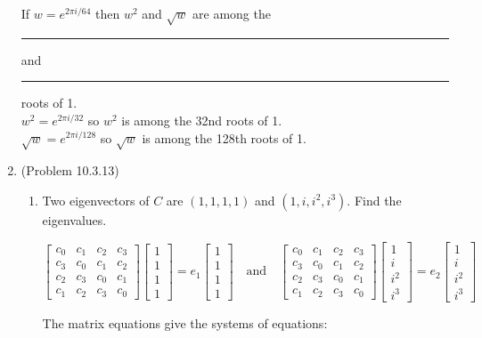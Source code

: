 \documentclass[a4paper]{article}
\begin{document}
\begin{enumerate}
If $w = e^{2\pi i / 64}$ then $w^2$ and $\sqrt{w}$ are among the \rule{1cm}{0.15mm} and \rule{1cm}{0.15mm} roots of 1. \\

$w^2 = e^{2\pi i / 32}$ so $w^2$ is among the 32nd roots of 1. \\
$\sqrt{w} = e^{2\pi i / 128}$ so $\sqrt{w}$ is among the 128th roots of 1. 

\item{(Problem 10.3.13)}

\begin{enumerate}
	\item
	Two eigenvectors of $C$ are $(1, 1, 1, 1)$ and
	$(1, i, i^2 , i^3)$. Find the eigenvalues.
	
	$$
	\begin{bmatrix}
	c_0 & c_1 & c_2 & c_3 \\
	c_3 & c_0 & c_1 & c_2 \\
	c_2 & c_3 & c_0 & c_1 \\
	c_1 & c_2 & c_3 & c_0 
	\end{bmatrix}
	\begin{bmatrix}
	1 \\ 1 \\ 1 \\ 1
	\end{bmatrix}
	=e_1
	\begin{bmatrix}
	1 \\ 1 \\ 1 \\ 1
	\end{bmatrix}
	\quad \text{and} \quad
	\begin{bmatrix}
	c_0 & c_1 & c_2 & c_3 \\
	c_3 & c_0 & c_1 & c_2 \\
	c_2 & c_3 & c_0 & c_1 \\
	c_1 & c_2 & c_3 & c_0 
	\end{bmatrix}
	\begin{bmatrix}
	1 \\ i \\ i^2 \\ i^3
	\end{bmatrix}
	=e_2
	\begin{bmatrix}
	1 \\ i \\ i^2 \\ i^3
	\end{bmatrix}
	$$
	
	The matrix equations give the systems of equations:
	

\end{enumerate}
\end{enumerate}
\end{document}
